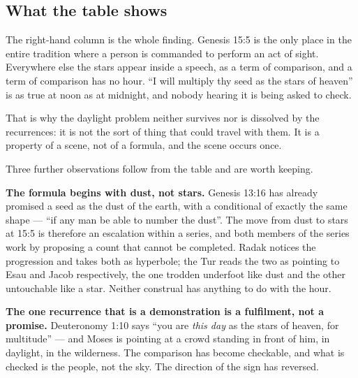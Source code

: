 \subsection{What the table shows}

The right-hand column is the whole finding. Genesis 15:5 is the only place in
the entire tradition where a person is commanded to perform an act of sight.
Everywhere else the stars appear inside a speech, as a term of comparison, and a
term of comparison has no hour. ``I will multiply thy seed as the stars of
heaven'' is as true at noon as at midnight, and nobody hearing it is being asked
to check.

That is why the daylight problem neither survives nor is dissolved by the
recurrences: it is not the sort of thing that could travel with them. It is a
property of a scene, not of a formula, and the scene occurs once.

Three further observations follow from the table and are worth keeping.

\textbf{The formula begins with dust, not stars.} Genesis 13:16 has already
promised a seed as the dust of the earth, with a conditional of exactly the same
shape --- ``if any man be able to number the dust''. The move from dust to stars
at 15:5 is therefore an escalation within a series, and both members of the
series work by proposing a count that cannot be completed. Radak notices the
progression and takes both as hyperbole; the Tur reads the two as pointing to
Esau and Jacob respectively, the one trodden underfoot like dust and the other
untouchable like a star. Neither construal has anything to do with the
hour.

\textbf{The one recurrence that is a demonstration is a fulfilment, not a
promise.} Deuteronomy 1:10 says ``you are \emph{this day} as the stars of heaven,
for multitude'' --- and Moses is pointing at a crowd standing in front of him, in
daylight, in the wilderness. The comparison has become checkable, and what is
checked is the people, not the sky. The direction of the sign has reversed.


